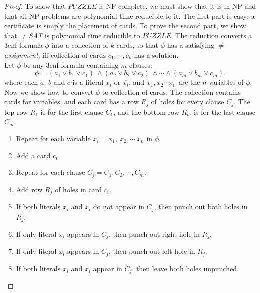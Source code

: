 \documentclass[11pt]{article}
\begin{document}
\begin{proof}
To show that $PUZZLE$ is NP-complete, we must show that it is in NP and that all NP-problems are polynomial time reducible to it. The first part is easy; a certificate is simply the placement of cards. To prove the second part, we show that $\neq$\textit{SAT} is polynomial time reducible to $PUZZLE$. The reduction converts a 3cnf-formula $\phi$ into a collection of $k$ cards, so that $\phi$ has a satisfying $\neq$\textit{-assignment}, iff collection of cards $c_1,\cdots, c_k$ has a solution. \\

Let $\phi$ be any 3cnf-formula containing $m$ clauses:
\[
\phi = (a_1 \vee b_1 \vee c_1) \ \wedge (a_2 \vee b_2 \vee c_2) \ \wedge \cdots \wedge (a_m \vee b_m \vee c_m).
\]
where each $a$, $b$ and $c$ is a literal $x_i$ or $\overline{x_i}$, and $x_1, x_2 \cdots x_n$ are the $n$ variables of $\phi$. Now we show how to convert $\phi$ to collection of cards. The collection contains cards for variables, and each card has a row $R_j$ of holes for every clause $C_j$. The top row $R_1$ is for the first clause $C_1$, and the bottom row $R_m$ is for the last clause $C_m$.

\begin{enumerate}
\item Repeat for each variable $x_i = x_1, \ x_2, \cdots \ x_n$ in $\phi$.
\item \hspace*{0.5cm} Add a card $c_i$.
\item \hspace*{0.5cm} Repeat for each clause $C_j = C_1, C_2, \cdots, C_m$:
\item \hspace*{1.2cm} Add row $R_j$ of holes in card $c_i$.
\item \hspace*{1.2cm} If both literals $x_i$ and $\overline{x_i}$ do not appear in $C_j$, then punch out both holes in $R_j$.
\item \hspace*{1.2cm} If only literal $x_i$ appears in $C_j$, then punch out right hole in $R_j$.
\item \hspace*{1.2cm} If only literal $\overline{x_i}$ appears in $C_j$, then punch out left hole in $R_j$.
\item \hspace*{1.2cm} If both literals $x_i$ and $\overline{x_i}$ appear in $C_j$, then leave both holes unpunched.
\end{enumerate}

\end{proof}
\end{document}
